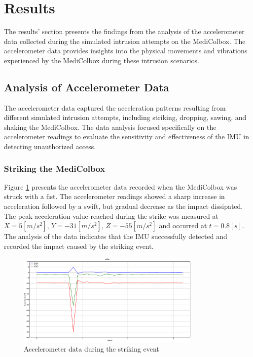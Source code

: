\documentclass[../main.tex]{subfiles}
\begin{document}
\section{Results}
The results' section presents the findings from the analysis of
the accelerometer data collected during the simulated intrusion attempts
on the MediColbox.
The accelerometer data provides insights into the physical movements
and vibrations experienced by the MediColbox during these intrusion scenarios.

\subsection{Analysis of Accelerometer Data}

The accelerometer data captured the acceleration patterns resulting from different simulated intrusion attempts, including striking, dropping, sawing, and shaking the MediColbox.
The data analysis focused specifically on the accelerometer readings to evaluate the sensitivity and effectiveness of the IMU in detecting unauthorized access.

\clearpage

\subsubsection{Striking the MediColbox}

Figure \ref{fig:accelerometer_striking} presents the
accelerometer data recorded when the MediColbox was
struck with a fist.
The accelerometer readings showed a sharp increase in
acceleration followed by a swift, but gradual decrease as
the impact dissipated.
The peak acceleration value reached during the
strike was measured at
$X = 5 [m/s^2]$, $Y = -31 [m/s^2]$, $Z = -55 [m/s^2]$
and occurred at $t = 0.8[s]$.
The analysis of the data indicates that the
IMU successfully detected and recorded the impact caused by the
striking event.

\begin{figure}[htbp]
    \centering
    \includegraphics[width=0.8\textwidth]{resources/figures/Acceleration_strike.eps}
    \caption{Accelerometer data during the striking event}
    \label{fig:accelerometer_striking}
\end{figure}
\end{document}
